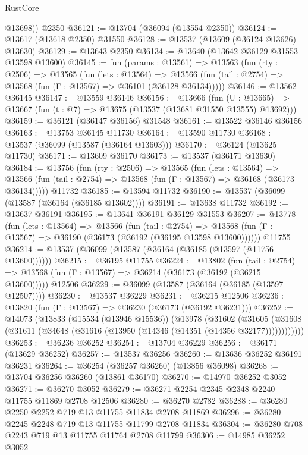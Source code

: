 \begin{lexlean}{RustCore}
\begin{coremodule}
        @13698))
    @2350
@36121 := @13704 (@36094 (@13554 @2350))
@36124 := @13617 (@13618 @2350) @31550
@36128 := @13537 (@13609 (@36124 @13626) @13630)
@36129 := @13643 @2350
@36134 := @13640 (@13642 @36129 @31553 @13598 @13600)
@36145 := fun (params : @13561) =>
  @13563
    (fun (rty : @2506) =>
    @13565
      (fun (lets : @13564) =>
      @13566 (fun (tail : @2754) => @13568 (fun (Γ : @13567) => @36101 (@36128 @36134)))))
@36146 := @13562 @36145
@36147 := @13559 @36146
@36156 := @13666
    (fun (U : @13665) => @13667 (fun (t : @7) => @13675 (@13537 (@13681 @31550 @13555) @13692)))
@36159 := @36121 (@36147 @36156) @31548
@36161 := @13522 @36146 @36156
@36163 := @13753 @36145 @11730
@36164 := @13590 @11730
@36168 := @13537 (@36099 (@13587 (@36164 @13603)))
@36170 := @36124 (@13625 @11730)
@36171 := @13609 @36170
@36173 := @13537 (@36171 @13630)
@36184 := @13756
    (fun (rty : @2506) =>
    @13565
      (fun (lets : @13564) =>
      @13566 (fun (tail : @2754) => @13568 (fun (Γ : @13567) => @36168 (@36173 @36134)))))
    @11732
@36185 := @13594 @11732
@36190 := @13537 (@36099 (@13587 (@36164 (@36185 @13602))))
@36191 := @13638 @11732
@36192 := @13637 @36191
@36195 := @13641 @36191 @36129 @31553
@36207 := @13778
    (fun (lets : @13564) =>
    @13566
      (fun (tail : @2754) =>
      @13568 (fun (Γ : @13567) => @36190 (@36173 (@36192 (@36195 @13598 @13600))))))
    @11755
@36214 := @13537 (@36099 (@13587 (@36164 (@36185 (@13597 (@11756 @13600))))))
@36215 := @36195 @11755
@36224 := @13802
    (fun (tail : @2754) => @13568 (fun (Γ : @13567) => @36214 (@36173 (@36192 (@36215 @13600)))))
    @12506
@36229 := @36099 (@13587 (@36164 (@36185 (@13597 @12507))))
@36230 := @13537 @36229
@36231 := @36215 @12506
@36236 := @13820 (fun (Γ : @13567) => @36230 (@36173 (@36192 @36231)))
@36252 := @14073
    (@13833
      (@15534 (@13946 @15536))
      (@13978
        (@31602
          (@31605 (@31608 (@31611 (@34648 (@31616 (@13950 (@14346 (@14351 (@14356 @32177))))))))))))
@36253 := @36236 @36252
@36254 := @13704 @36229
@36256 := @36171 (@13629 @36252)
@36257 := @13537 @36256
@36260 := @13636 @36252 @36191 @36231
@36264 := @36254 (@36257 @36260) (@13856 @36098)
@36268 := @13704 @36256 @36260 (@13861 @36170)
@36270 := @14970 @36252 @3052
@36271 := @36270 @3052
@36279 := @36271 @2254 @2345 @2348 @2240 @11755 @11869 @2708 @12506
@36280 := @36270 @2782
@36288 := @36280 @2250 @2252 @719 @13 @11755 @11834 @2708 @11869
@36296 := @36280 @2245 @2248 @719 @13 @11755 @11799 @2708 @11834
@36304 := @36280 @708 @2243 @719 @13 @11755 @11764 @2708 @11799
@36306 := @14985 @36252 @3052

\end{coremodule}
\end{lexlean}
